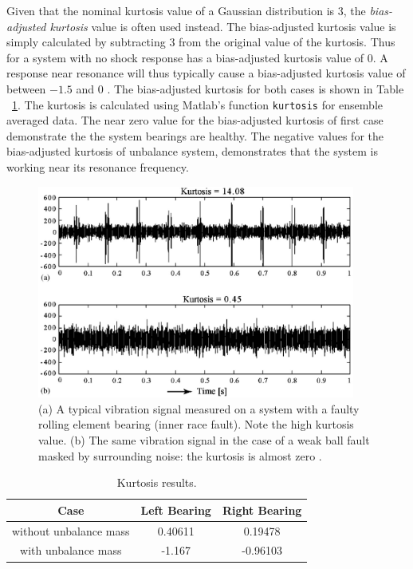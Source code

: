\documentclass[paper=a4, fontsize=12pt]{scrartcl} %
\begin{document}
Given that the nominal kurtosis value of a Gaussian distribution is $3$, the \emph{bias-adjusted kurtosis} value is often used instead. The bias-adjusted kurtosis value is simply calculated by subtracting $3$ from the original value of the kurtosis. Thus for a system with no shock response has a bias-adjusted kurtosis value of $0$. A response near resonance will thus typically cause a bias-adjusted kurtosis value of between $-1.5$ and $0$ \cite{Slater2002vibration}. The bias-adjusted kurtosis for both cases is shown in Table ~\ref{table:results}. The kurtosis is calculated using Matlab's function \texttt{kurtosis} for ensemble averaged data. The near zero value for the bias-adjusted kurtosis of first case demonstrate the the system bearings are healthy. The negative values for the bias-adjusted kurtosis of unbalance system, demonstrates that the system is working near its resonance frequency.
%
\begin{figure}[H]
	\centering
	\includegraphics[height = 7.0cm]{kurtosis_example.jpg}
	\caption{(a) A typical vibration signal measured on a system with a faulty rolling element bearing (inner race fault). Note the high kurtosis value. (b) The same vibration signal in the case of a weak ball fault masked by surrounding noise: the kurtosis is almost zero \cite{antoni2006spectral}.}
	\label{fig:kurtosis_example}
\end{figure}
%
%
\begin{table}[H]
\centering
\begin{tabular}{ c | c | c }
		Case & Left Bearing & Right Bearing \\
	\hline                       
	\hline
		without unbalance mass & 0.40611 & 0.19478 \\
		with unbalance mass & -1.167 & -0.96103 \\
	\hline  
\end{tabular}
\caption{Kurtosis results.}
\label{table:results}
\end{table}
%
  

\end{document}
